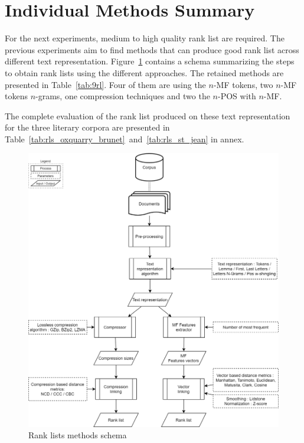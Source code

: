 \section{Individual Methods Summary \label{sec:individual_methods_summary}}

For the next experiments, medium to high quality rank list are required.
The previous experiments aim to find methods that can produce good rank list across different text representation.
Figure~\ref{fig:schema-rank_lists} contains a schema summarizing the steps to obtain rank lists using the different approaches.
The retained methods are presented in Table~\ref{tab:9rl}.
Four of them are using the $n$-MF tokens, two $n$-MF tokens $n$-grams, one compression techniques and two the $n$-POS with $n$-MF.

The complete evaluation of the rank list produced on these text representation for the three literary corpora are presented in Table~\ref{tab:rls_oxquarry_brunet}~and~\ref{tab:rls_st_jean} in annex.

\begin{figure}
  \centering
  \caption{Rank lists methods schema}
  \label{fig:schema-rank_lists}
  \includegraphics[width=0.90\linewidth]{img/schema-rank_lists.png}
\end{figure}

